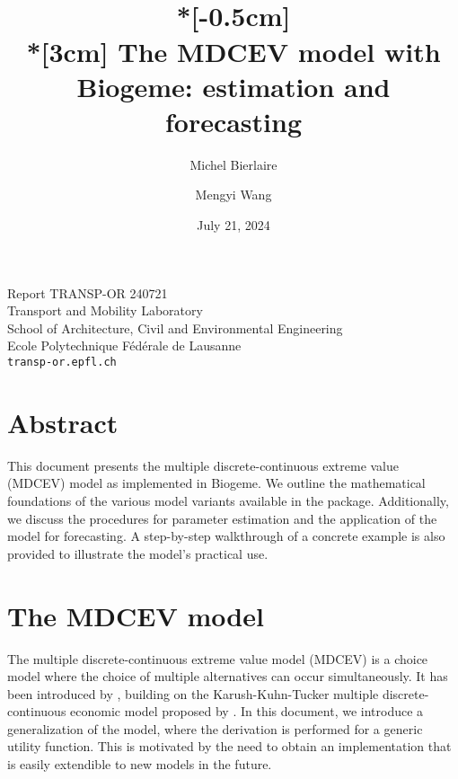 \documentclass[12pt,a4paper]{article}
\title{
  \vspace{-3cm}
  \epsfig{figure=transp-or.eps,height=2cm}
  \hfill
  \epsfig{figure=epfl,height=1.5cm}   \\*[-0.5cm]
  \mbox{}\hrulefill\mbox{} \\*[3cm] The MDCEV model with Biogeme: estimation and forecasting}
\author{Michel Bierlaire \and Mengyi Wang}
\date{July 21, 2024}
\begin{document}
\begin{titlepage}
\pagestyle{empty}

\maketitle
\vspace{2cm}


\begin{center}

\small Report TRANSP-OR 240721 \\ Transport and Mobility Laboratory \\ School of Architecture, Civil and Environmental Engineering \\ Ecole Polytechnique F\'ed\'erale de Lausanne \\ \verb+transp-or.epfl.ch+
\end{center}


\end{titlepage}


\section*{Abstract}

This document presents the multiple discrete-continuous extreme value (MDCEV) model as implemented in Biogeme. We outline the mathematical foundations of the various model variants available in the package. Additionally, we discuss the procedures for parameter estimation and the application of the model for forecasting. A step-by-step walkthrough of a concrete example is also provided to illustrate the model's practical use.

\section{The MDCEV model}

The multiple discrete-continuous extreme value model (MDCEV) is a
choice model where the choice of multiple alternatives can occur
simultaneously. It has been introduced by ,
building on the Karush-Kuhn-Tucker multiple discrete-continuous
economic model proposed by . In this
document, we introduce a generalization of the model, where the
derivation is performed for a generic utility function. This is
motivated by the need to obtain an implementation that is easily
extendible to new models in the future.
\end{document}
